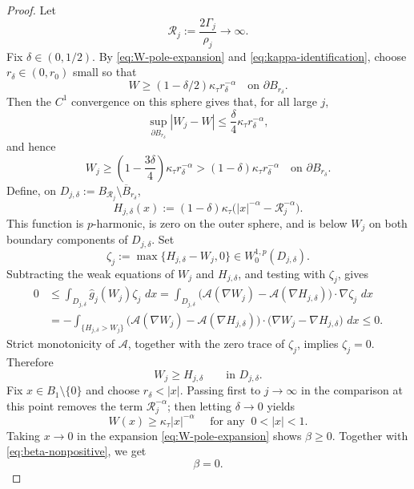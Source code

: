 \documentclass[reqno,12pt]{amsart}
\numberwithin{equation}{section}
\theoremstyle{remark}
\newcommand{\dd}{\,d}
\newcommand{\Acal}{\mathcal A}
\begin{document}
\begin{proof}
\medskip
{}
Let
$$
\mathcal R_j:=\frac{2\Gamma_j}{\rho_j}\to \infty.
$$
Fix $\delta\in(0,1/2)$.  By \eqref{eq:W-pole-expansion} and \eqref{eq:kappa-identification}, choose
$r_\delta\in(0,r_0)$ small so that
$$
W\ge(1-\delta/2)\kappa_\tau r_\delta^{-\alpha}
\quad\text{on }\partial B_{r_\delta}.
$$
Then the $C^1$ convergence on this sphere gives that, for all large $j$,
$$
\sup_{\partial B_{r_\delta}}|W_j-W|
\le \frac{\delta}{4}\kappa_\tau r_\delta^{-\alpha},
$$
and hence
$$
W_j\ge\left(1-\frac{3\delta}{4}\right)
\kappa_\tau r_\delta^{-\alpha}
>(1-\delta)\kappa_\tau r_\delta^{-\alpha}
\quad\text{on }\partial B_{r_\delta}.
$$
Define, on $D_{j,\delta}:=B_{\mathcal R_j}\setminus\overline B_{r_\delta}$,
$$
H_{j,\delta}(x)
:=(1-\delta)\kappa_\tau
  \bigl(|x|^{-\alpha}-\mathcal R_j^{-\alpha}\bigr).
$$
This function is $p$-harmonic, is zero on the outer sphere, and is below $W_j$ on both boundary components of $D_{j,\delta}$.  Set
$$
\zeta_j := \max\{H_{j,\delta}-W_j,0\} \in W^{1,p}_0(D_{j,\delta}).
$$
Subtracting the weak equations of $W_j$ and $H_{j,\delta}$, and testing with $\zeta_j$, gives
\begin{align*}
0 &\le\int_{D_{j,\delta}}\widehat g_j(W_j)\zeta_j\,\dd x =
\int_{D_{j,\delta}}\bigl(\Acal(\nabla W_j)-\Acal(\nabla H_{j,\delta})\bigr)\cdot\nabla\zeta_j\,\dd x\\
&=-\int_{\{H_{j,\delta}>W_j\}}
\bigl(\Acal(\nabla W_j)-\Acal(\nabla H_{j,\delta})\bigr)\cdot\bigl(\nabla W_j-\nabla H_{j,\delta}\bigr)\,\dd x \le 0.
\end{align*}
Strict monotonicity of $\Acal$, together with the zero trace of $\zeta_j$, implies $\zeta_j=0$.  Therefore
$$
W_j\ge H_{j,\delta} \qquad\text{in }D_{j,\delta}.
$$
Fix $x\in B_1\setminus\{0\}$ and choose $r_\delta<|x|$.  Passing first to $j\to\infty$ in the comparison at this point removes the term $\mathcal R_j^{-\alpha}$; then letting $\delta\to 0$ yields
\begin{equation}\label{eq:W-above-pole}
W(x)\ge\kappa_\tau|x|^{-\alpha} \quad \text{ for any } \ 0<|x|<1.
\end{equation}
Taking $x\to0$ in the expansion \eqref{eq:W-pole-expansion} shows $\beta\ge 0$.  Together with \eqref{eq:beta-nonpositive}, we get
\begin{equation}\label{eq:beta-zero}
\beta=0.
\end{equation}


\end{proof}
\end{document}
